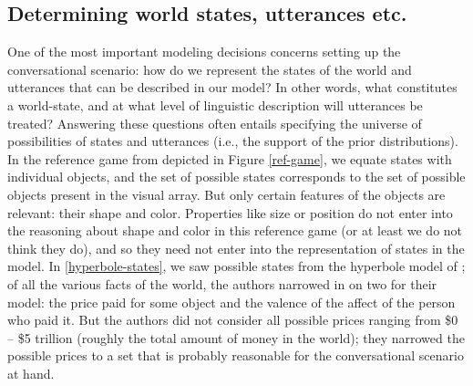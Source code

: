 \documentclass{sp}
\begin{document}
\subsection{Determining world states, utterances etc.} \label{practicalities-prior}



One of the most important modeling decisions concerns setting up the conversational scenario: how do we represent the states of the world and utterances that can be described in our model? In other words, what constitutes a world-state, and at what level of linguistic description will utterances be treated? Answering these questions often entails specifying the universe of possibilities of states and utterances (i.e., the support of the prior distributions).
In the reference game from \cite{frankgoodman2012} depicted in Figure \ref{ref-game}, we equate states with individual objects, and the set of possible states corresponds to the set of possible objects present in the visual array. But only certain features of the objects are relevant: their shape and color. Properties like size or position do not enter into the reasoning about shape and color in this reference game (or at least we do not think they do), and so they need not enter into the representation of states in the model. In \ref{hyperbole-states}, we saw possible states from the hyperbole model of \cite{kaoetal2014}; of all the various facts of the world, the authors narrowed in on two for their model: the price paid for some object and the valence of the affect of the person who paid it. 
But the authors did not consider all possible prices ranging from \$0  -- \$5 trillion (roughly the total amount of money in the world); they narrowed the possible prices to a set that is probably reasonable for the conversational scenario at hand.
\end{document}
